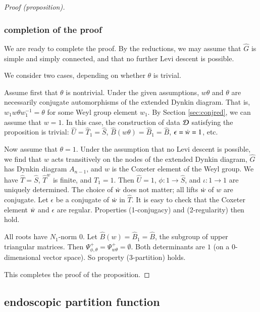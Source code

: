 \begin{proof}[Proof (proposition)]
\subsubsection{completion of the proof}

We are ready to complete the proof.  By the reductions, we may assume
that $\hat G$ is simple and simply connected, and that no further Levi
descent is possible.

We consider two cases, depending on whether $\theta$ is trivial.

Assume first that $\theta$ is nontrivial.  Under the given
assumptions, $w\theta$ and $\theta$ are necessarily conjugate
automorphisms of the extended Dynkin diagram.  That is, $w_1 w \theta
w_1^{-1} = \theta$ for some Weyl group element $w_1$.  By Section
\ref{sec:conjred}, we can assume that $w=1$.  In this case, the
construction of data $\mathcal D$ satisfying the proposition is trivial: $\hat
U = \hat T_1 =\hat S$, $\hat B(w\theta) = \hat B_1 = \hat B$,
$\epsilon = \dot w = 1$, etc.

Now assume that $\theta=1$.  Under the assumption that no Levi descent
is possible, we find that $w$ acts transitively on the nodes of the
extended Dynkin diagram, $\hat G$ has Dynkin diagram $A_{n-1}$, and
$w$ is the Coxeter element of the Weyl group.  We have $\hat T = \hat
S$, $\hat T^w$ is finite, and $\hat T_1 = 1$.  Then $\hat U = 1$,
$\phi:1\to \hat S$, and $\iota:1\to 1$ are uniquely determined.  The
choice of $\dot w$ does not matter; all lifts $\dot w$ of $w$ are
conjugate.  Let $\epsilon$ be a conjugate of $\dot w$ in $\hat T$.  It
is easy to check that the Coxeter element $\dot w$ and $\epsilon$ are
regular.  Properties (1-conjugacy) and (2-regularity) then hold.

All roots have $N_1$-norm $0$.  Let $\hat B(w) = \hat B_1 = \hat B$,
the subgroup of upper triangular matrices.  Then $\Psi_{\phi,\theta}^+
= \Psi_{w\theta}^+=\emptyset$.  Both determinants are $1$ (on a
$0$-dimensional vector space).  So property (3-partition) holds.

This completes the proof of the proposition.
\end{proof}


\subsection{endoscopic partition function}

